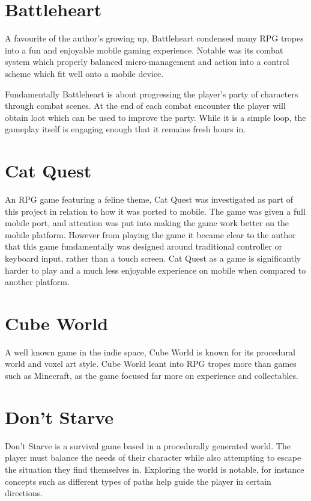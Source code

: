 \documentclass[a4paper]{scrreprt}
\begin{document}
\section{Battleheart}
A favourite of the author's growing up, Battleheart condensed many RPG tropes into a fun and enjoyable mobile gaming experience.
Notable was its combat system which properly balanced micro-management and action into a control scheme which fit well onto a mobile device.

Fundamentally Battleheart is about progressing the player's party of characters through combat scenes.
At the end of each combat encounter the player will obtain loot which can be used to improve the party.
While it is a simple loop, the gameplay itself is engaging enough that it remains fresh hours in.

\section{Cat Quest}
An RPG game featuring a feline theme, Cat Quest was investigated as part of this project in relation to how it was ported to mobile.
The game was given a full mobile port, and attention was put into making the game work better on the mobile platform.
However from playing the game it became clear to the author that this game fundamentally was designed around traditional controller or keyboard input, rather than a touch screen.
Cat Quest as a game is significantly harder to play and a much less enjoyable experience on mobile when compared to another platform.

\section{Cube World}
A well known game in the indie space, Cube World is known for its procedural world and voxel art style.
Cube World leant into RPG tropes more than games such as Minecraft, as the game focused far more on experience and collectables.

\section{Don't Starve}
Don't Starve is a survival game based in a procedurally generated world.
The player must balance the needs of their character while also attempting to escape the situation they find themselves in.
Exploring the world is notable, for instance concepts such as different types of paths help guide the player in certain directions.
\end{document}
